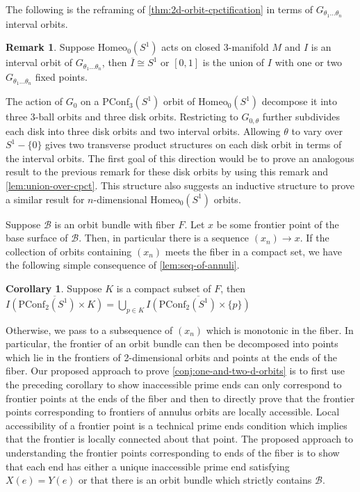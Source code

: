 \documentclass[10pt, oneside]{article}
\newcommand{\homeo}[1][S^1]{\text{Homeo}_0(#1)}
\newcommand{\cl}[1]{\overline{#1}}
\newcommand{\pconf}[2][S^1]{\text{PConf}_{#2}(#1)}
\theoremstyle{definition}
\newtheorem{rem}{Remark}[section]
\newtheorem{cor}{Corollary}[section]
\theoremstyle{definition}
\begin{document}
The following is the reframing of \cref{thm:2d-orbit-cpctification} in terms of $G_{\theta_1\dots\theta_n}$ interval orbits.

\begin{rem}
    Suppose $\homeo$ acts on closed 3-manifold $M$ and $I$ is an interval orbit of $G_{\theta_1\dots\theta_n}$, then $\cl{I}\cong S^1$ or $[0,1]$ is the union of $I$ with one or two $G_{\theta_1\dots\theta_n}$ fixed points.
\end{rem}

The action of $G_0$ on a $\pconf{3}$ orbit of $\homeo$ decompose it into three 3-ball orbits and three disk orbits. Restricting to $G_{0,\theta}$ further subdivides each disk into three disk orbits and two interval orbits. Allowing $\theta$ to vary over $S^1-\{0\}$ gives two transverse product structures on each disk orbit in terms of the interval orbits.
The first goal of this direction would be to prove an analogous result to the previous remark for these disk orbits by using this remark and \cref{lem:union-over-cpct}. This structure also suggests an inductive structure to prove a similar result for $n$-dimensional $\homeo$ orbits.

Suppose $\mathcal{B}$ is an orbit bundle with fiber $F$. Let $x$ be some frontier point of the base surface of $\mathcal{B}$. Then, in particular there is a sequence $(x_n)\to x$. If the collection of orbits containing $(x_n)$ meets the fiber in a compact set, we have the following simple consequence of \cref{lem:seq-of-annuli}.
\begin{cor}
     Suppose $K$ is a compact subset of $F$, then $\cl{I(\pconf{2}\times K)} = \bigcup_{p\in K} \cl{I(\pconf{2}\times \{p\})}$
\end{cor}
Otherwise, we pass to a subsequence of $(x_n)$ which is monotonic in the fiber. In particular, the frontier of an orbit bundle can then be decomposed into points which lie in the frontiers of 2-dimensional orbits and points at the ends of the fiber. Our proposed approach to prove \cref{conj:one-and-two-d-orbits} is to first use the preceding corollary to show inaccessible prime ends can only correspond to frontier points at the ends of the fiber and then to directly prove that the frontier points corresponding to frontiers of annulus orbits are locally accessible. Local accessibility of a frontier point is a technical prime ends condition which implies that the frontier is locally connected about that point. The proposed approach to understanding the frontier points corresponding to ends of the fiber is to show that each end has either a unique inaccessible prime end satisfying $X(e)=Y(e)$ or that there is an orbit bundle which strictly contains $\mathcal{B}$.
\end{document}
